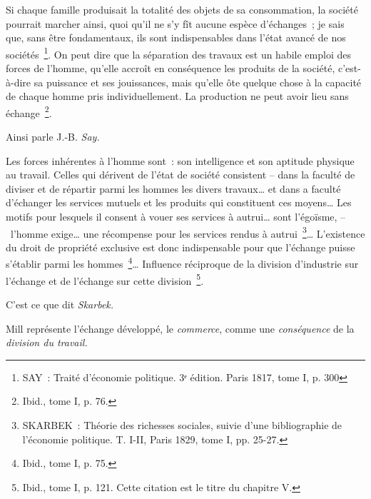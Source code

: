 \documentclass[french,twoside]{book} %
\newenvironment{quoteblock}%
  {\begin{quoting}}
  {\end{quoting}}
\newenvironment{quotebar}{%
    \def\FrameCommand{{\color{rubric!10!}\vrule width 0.5em} \hspace{0.9em}}%
    \def\OuterFrameSep{\itemsep} %
    \MakeFramed {\advance\hsize-\width \FrameRestore}
  }%
  {%
    \endMakeFramed
  }
\renewenvironment{quoteblock}%
  {%
    \savenotes
    \setstretch{0.9}
    \normalfont
    \begin{quotebar}
  }
  {%
    \end{quotebar}
    \spewnotes
  }
\begin{document}
\begin{quoteblock}
 \noindent Si chaque famille produisait la totalité des objets de sa consommation, la société pourrait marcher ainsi, quoi qu’il ne s’y fît aucune espèce d’échanges ; je sais que, sans être fondamentaux, ils sont indispensables dans l’état avancé de nos sociétés \footnote{SAY : Traité d’économie politique. 3ᵉ édition. Paris 1817, tome I, p. 300}. On peut dire que la séparation des travaux est un habile emploi des forces de l’homme, qu’elle accroît en conséquence les produits de la société, c’est-à-dire sa puissance et ses jouissances, mais qu’elle ôte quelque chose à la capacité de chaque homme pris individuellement. La production ne peut avoir lieu sans échange \footnote{Ibid., tome I, p. 76.}.
 \end{quoteblock}

\noindent Ainsi parle J.-B. \emph{Say.}\par

\begin{quoteblock}
 \noindent Les forces inhérentes à l’homme sont : son intelligence et son aptitude physique au travail. Celles qui dérivent de l’état de société consistent – dans la faculté de diviser et de répartir parmi les hommes les divers travaux… et dans a faculté d’échanger les services mutuels et les produits qui constituent ces moyens… Les motifs pour lesquels il consent à vouer ses services à autrui… sont l’égoïsme, – l’homme exige… une récompense pour les services rendus à autrui \footnote{SKARBEK : Théorie des richesses sociales, suivie d’une bibliographie de l’économie politique. T. I-II, Paris 1829, tome I, pp. 25-27.}… L’existence du droit de propriété exclusive est donc indispensable pour que l’échange puisse s’établir parmi les hommes \footnote{Ibid., tome I, p. 75.}… Influence réciproque de la division d’industrie sur l’échange et de l’échange sur cette division \footnote{Ibid., tome I, p. 121. Cette citation est le titre du chapitre V.}.
 \end{quoteblock}

\noindent C’est ce que dit \emph{Skarbek.}\par
Mill représente l’échange développé, le \emph{commerce}, comme une \emph{conséquence} de la \emph{division du travail.}\par
\end{document}
